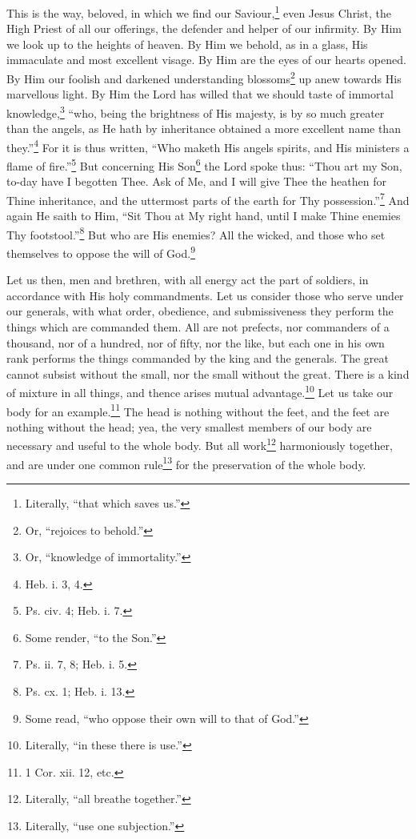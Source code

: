 This is the way, beloved, in which we find our Saviour,\footnote{Literally, “that which saves us.”} even Jesus Christ, the High Priest of all our offerings, the defender and helper of our infirmity. By Him we look up to the heights of heaven. By Him we behold, as in a glass, His immaculate and most excellent visage. By Him are the eyes of our hearts opened. By Him our foolish and darkened understanding blossoms\footnote{Or, “rejoices to behold.”} up anew towards His marvellous light. By Him the Lord has willed that we should taste of immortal  knowledge,\footnote{Or, “knowledge of immortality.”} “who, being the brightness of His majesty, is by so much greater than the angels, as He hath by inheritance obtained a more excellent name than they.”\footnote{Heb. i. 3, 4.} For it is thus written, “Who maketh His angels spirits, and His ministers a flame of fire.”\footnote{Ps. civ. 4; Heb. i. 7.} But concerning His Son\footnote{Some render, “to the Son.”} the Lord spoke thus: “Thou art my Son, to-day have I begotten Thee. Ask of Me, and I will give Thee the heathen for Thine inheritance, and the uttermost parts of the earth for Thy possession.”\footnote{Ps. ii. 7, 8; Heb. i. 5.} And again He saith to Him, “Sit Thou at My right hand, until I make Thine enemies Thy footstool.”\footnote{Ps. cx. 1; Heb. i. 13.} But who are His enemies? All the wicked, and those who set themselves to oppose the will of God.\footnote{Some read, “who oppose their own will to that of God.”}


Let us then, men and brethren, with all energy act the part of soldiers, in accordance with His holy commandments. Let us consider those who serve under our generals, with what order, obedience, and submissiveness they perform the things which are commanded them. All are not prefects, nor commanders of a thousand, nor of a hundred, nor of fifty, nor the like, but each one in his own rank performs the things commanded by the king and the generals. The great cannot subsist without the small, nor the small without the great. There is a kind of mixture in all things, and thence arises mutual advantage.\footnote{Literally, “in these there is use.”} Let us take our body for an example.\footnote{1 Cor. xii. 12, etc.} The head is nothing without the feet, and the feet are nothing without the head; yea, the very smallest members of our body are necessary and useful to the whole body. But all work\footnote{Literally, “all breathe together.”} harmoniously together, and are under one common rule\footnote{Literally, “use one subjection.”} for the preservation of the whole body.

